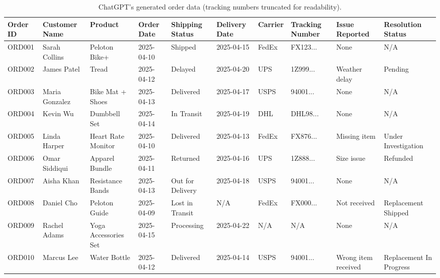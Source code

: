 \documentclass[11pt,letterpaper]{article}
\begin{document}
\begin{table}
    \centering
    \begin{tabular}{p{1.1cm} p{1.8cm} p{1.8cm} p{1.8cm} p{1.8cm} p{1.8cm} p{1.8cm} p{1.8cm} p{1.5cm} p{1.8cm}}
Order ID & Customer Name & Product & Order Date & Shipping Status & Delivery Date & Carrier & Tracking Number & Issue Reported  & Resolution Status   \\
\hline
ORD001 & Sarah Collins     & Peloton Bike+        & 2025-04-10 & Shipped & 2025-04-15   & FedEx & FX123... & None & N/A \\
ORD002 & James Patel       & Tread                & 2025-04-12 & Delayed & 2025-04-20   & UPS   & 1Z999... & Weather delay & Pending     \\
ORD003 & Maria Gonzalez    & Bike Mat + Shoes     & 2025-04-13 & Delivered & 2025-04-17 & USPS  & 94001... & None & N/A \\
ORD004 & Kevin Wu          & Dumbbell Set         & 2025-04-14 & In Transit & 2025-04-19 & DHL  & DHL98... & None & N/A \\
ORD005 & Linda Harper      & Heart Rate Monitor   & 2025-04-10 & Delivered & 2025-04-13 & FedEx & FX876... & Missing item & Under Investigation     \\
ORD006 & Omar Siddiqui     & Apparel Bundle       & 2025-04-11 & Returned & 2025-04-16  & UPS   & 1Z888... & Size issue & Refunded    \\
ORD007 & Aisha Khan        & Resistance Bands     & 2025-04-13 & Out for Delivery & 2025-04-18   & USPS        & 94001... & None    & N/A         \\
ORD008 & Daniel Cho        & Peloton Guide        & 2025-04-09 & Lost in Transit & N/A & FedEx & FX000... & Not received & Replacement Shipped \\
ORD009 & Rachel Adams      & Yoga Accessories Set & 2025-04-15 & Processing & 2025-04-22   & N/A & N/A & None    & N/A \\
ORD010 & Marcus Lee        & Water Bottle         & 2025-04-12 & Delivered & 2025-04-14   & USPS & 94001... & Wrong item received & Replacement In Progress \\
        
    \end{tabular}
    \caption{ChatGPT's generated order data (tracking numbers truncated for readability).}
    \label{table:orders}
  \end{table}

\clearpage
\end{document}
